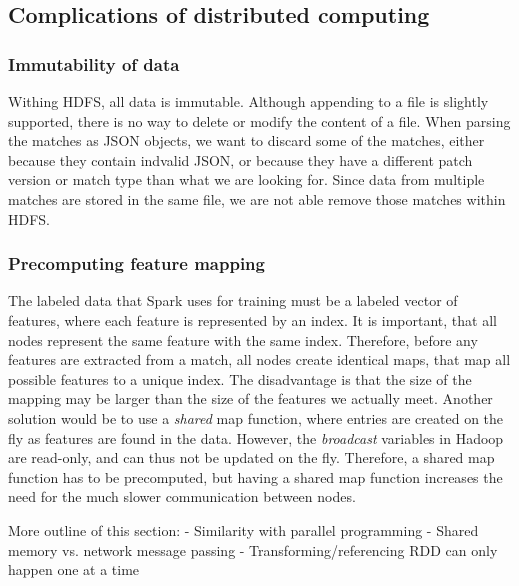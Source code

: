\subsection{Complications of distributed computing}\label{sec:complications}

\subsubsection{Immutability of data}
Withing HDFS, all data is immutable. Although appending to a file is slightly supported, there is no way to delete or modify the content of a file.
When parsing the matches as JSON objects, we want to discard some of the matches, either because they contain indvalid JSON, or because they have a different patch version or match type than what we are looking for. Since data from multiple matches are stored in the same file, we are not able remove those matches within HDFS.

\subsubsection{Precomputing feature mapping}
The labeled data that Spark uses for training must be a labeled vector of features, where each feature is represented by an index.
It is important, that all nodes represent the same feature with the same index. Therefore, before any features are extracted from a match, all nodes create identical maps, that map all possible features to a unique index. The disadvantage is that the size of the mapping may be larger than the size of the features we actually meet.
Another solution would be to use a \emph{shared} map function, where entries are created on the fly as features are found in the data.
However, the \emph{broadcast} variables in Hadoop are read-only, and can thus not be updated on the fly.
Therefore, a shared map function has to be precomputed, but having a shared map function increases the need for the much slower communication between nodes.

More outline of this section:
- Similarity with parallel programming
    - Shared memory vs. network message passing
- Transforming/referencing RDD can only happen one at a time

